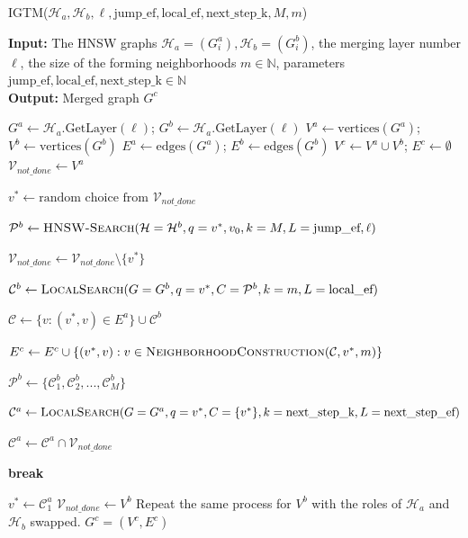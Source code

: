 \documentclass{article}
\begin{document}
\begin{algorithm}
\caption{\textsc{IGTM}($\mathcal{H}_a, \mathcal{H}_b, \ell, \text{jump\_ef}, \text{local\_ef}, \text{next\_step\_k}, M, m$)}\label{alg:IGTM}
\textbf{Input:} The HNSW graphs $\mathcal{H}_a = (G^a_i), \mathcal{H}_b = (G^b_i)$, the merging layer number $\ell$, the size of the forming neighborhoods $m \in \mathbb{N}$, parameters $\text{jump\_ef}, \text{local\_ef}, \text{next\_step\_k} \in \mathbb{N}$ \\
\textbf{Output:}  Merged graph $G^c$ 
\begin{algorithmic}[1]
\State $G^a \gets \mathcal{H}_a\text{.GetLayer}(\ell) $; $G^b \gets\mathcal{H}_a\text{.GetLayer}(\ell)$ 
\State $V^a \gets \text{vertices}(G^a)$; $V^b \gets \text{vertices}(G^b)$
\State $E^a \gets \text{edges}(G^a)$; $E^b \gets \text{edges}(G^b)$
\State $V^c \gets V^a \cup V^b$; $E^c \gets \emptyset$ 
\State $\mathcal{V}_{not\_done} \gets V^a$

    \State $v^* \gets \text{random choice from } \mathcal{V}_{not\_done}$
    
    \State $\mathcal{P}^b  \gets \textsc{HNSW-Search}(\mathcal{H}=\mathcal{H}^b, q=v^*, v_0, k=M, L=\text{jump\_ef}, \ell)$
    
        \State $\mathcal{V}_{not\_done} \gets \mathcal{V}_{not\_done} \setminus \{v^*\}$
        
        \State $\mathcal{C}^b  \gets \textsc{LocalSearch}(G=G^b, q=v^*, C=\mathcal{P}^b , k=m, L=\text{local\_ef})$
        
        \State $\mathcal{C} \gets  \{v : (v^*, v) \in E^a \} \cup \mathcal{C}^b$
        
        \State $E^c \gets E^c \cup  \{ (v^*, v)  : v \in \textsc{NeighborhoodConstruction}(\mathcal{C}, v^*, m) \}$

        \State $\mathcal{P}^b \gets \{\mathcal{C}^b_1, \mathcal{C}^b_2, ..., \mathcal{C}^b_M \} $

        \State $\mathcal{C}^a  \gets \textsc{LocalSearch}(G=G^a, q=v^*, C=\{v^*\} , k=\text{next\_step\_k}, L=\text{next\_step\_ef})$
        
        \State $\mathcal{C}^a \gets \mathcal{C}^a \cap \mathcal{V}_{not\_done}$
        
            \State \textbf{break}
        \EndIf
        
        \State $v^* \gets \mathcal{C}^a_1$
    \EndWhile
\EndWhile
\State $\mathcal{V}_{not\_done} \gets V^b$
    \State Repeat the same process for $V^b$ with the roles of $\mathcal{H}_a$ and $\mathcal{H}_b$ swapped.
\EndWhile
\State \Return $G^c=(V^c,E^c)$
\end{algorithmic}
\end{algorithm}
\end{document}
